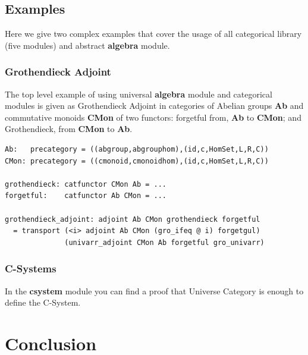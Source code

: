 \documentclass{article}
\begin{document}
\subsection{Examples}

Here we give two complex examples that cover the usage of all categorical library (five modules)
and abstract {\bf algebra} module.

\subsubsection*{Grothendieck Adjoint}

The top level example of using universal {\bf algebra} module and categorical modules
is given as Grothendieck Adjoint in categories of Abelian groups {\bf Ab} and
commutative monoids {\bf CMon} of two functors: forgetful from, {\bf Ab} to {\bf CMon}; and
Grothendieck, from {\bf CMon} to {\bf Ab}.

\begin{lstlisting}[mathescape=true]
Ab:   precategory = ((abgroup,abgrouphom),(id,c,HomSet,L,R,C))
CMon: precategory = ((cmonoid,cmonoidhom),(id,c,HomSet,L,R,C))

grothendieck: catfunctor CMon Ab = ...
forgetful:    catfunctor Ab CMon = ...

grothendieck_adjoint: adjoint Ab CMon grothendieck forgetful
  = transport (<i> adjoint Ab CMon (gro_ifeq @ i) forgetgul)
              (univarr_adjoint CMon Ab forgetful gro_univarr)
\end{lstlisting}

\subsubsection*{C-Systems}

In the {\bf csystem} module you can find a proof that
Universe Category is enough to define the C-System.


\newpage
\section{Conclusion}
\end{document}
